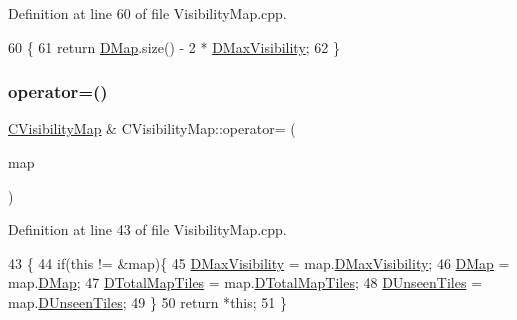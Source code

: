 Definition at line 60 of file Visibility\+Map.\+cpp.


\begin{DoxyCode}
60                                 \{
61     \textcolor{keywordflow}{return} \hyperlink{classCVisibilityMap_ad217bc34f7a50dd357a3eeeb69cfdd85}{DMap}.size() - 2 * \hyperlink{classCVisibilityMap_ac8f71b9541c903fce0294d75daa1bbb1}{DMaxVisibility};
62 \}
\end{DoxyCode}
\hypertarget{classCVisibilityMap_a704cb26f12821ba012619ca1ae164ab5}{}\label{classCVisibilityMap_a704cb26f12821ba012619ca1ae164ab5} 
\subsubsection{\texorpdfstring{operator=()}{operator=()}}
{\footnotesize\ttfamily \hyperlink{classCVisibilityMap}{C\+Visibility\+Map} \& C\+Visibility\+Map\+::operator= (\begin{DoxyParamCaption}\item[{const \hyperlink{classCVisibilityMap}{C\+Visibility\+Map} \&}]{map }\end{DoxyParamCaption})}



Definition at line 43 of file Visibility\+Map.\+cpp.


\begin{DoxyCode}
43                                                                   \{
44     \textcolor{keywordflow}{if}(\textcolor{keyword}{this} != &map)\{
45         \hyperlink{classCVisibilityMap_ac8f71b9541c903fce0294d75daa1bbb1}{DMaxVisibility} = map.\hyperlink{classCVisibilityMap_ac8f71b9541c903fce0294d75daa1bbb1}{DMaxVisibility};
46         \hyperlink{classCVisibilityMap_ad217bc34f7a50dd357a3eeeb69cfdd85}{DMap} = map.\hyperlink{classCVisibilityMap_ad217bc34f7a50dd357a3eeeb69cfdd85}{DMap};   
47         \hyperlink{classCVisibilityMap_a9bd6e633268535677aeefbd886c29485}{DTotalMapTiles} = map.\hyperlink{classCVisibilityMap_a9bd6e633268535677aeefbd886c29485}{DTotalMapTiles};
48         \hyperlink{classCVisibilityMap_a117ff39fef73ffd4cc4ba35c35e63171}{DUnseenTiles} = map.\hyperlink{classCVisibilityMap_a117ff39fef73ffd4cc4ba35c35e63171}{DUnseenTiles};
49     \}
50     \textcolor{keywordflow}{return} *\textcolor{keyword}{this};
51 \}
\end{DoxyCode}
\hypertarget{classCVisibilityMap_a1474250aca17378ff10f12b652bdc34a}{}\label{classCVisibilityMap_a1474250aca17378ff10f12b652bdc34a} 
